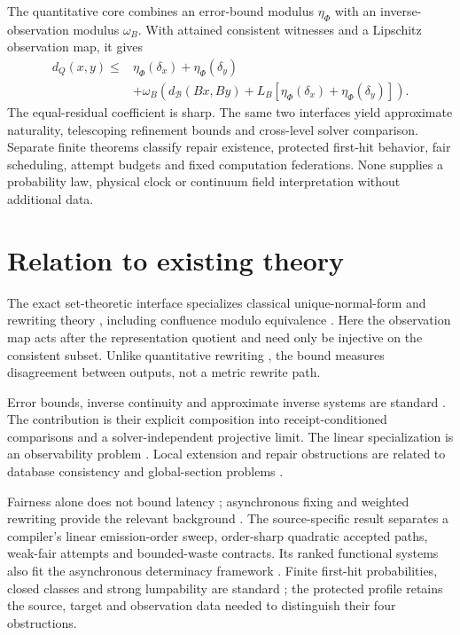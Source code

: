 \documentclass[11pt]{article}
\theoremstyle{definition}
\theoremstyle{remark}
\numberwithin{equation}{section}
\newcommand{\cB}{\mathcal B}
\begin{document}
The quantitative core combines an error-bound modulus $\eta_\Phi$ with
an inverse-observation modulus $\omega_B$. With attained consistent
witnesses and a Lipschitz observation map, it gives
\begin{equation}\label{eq:intro-master}
\begin{split}
 d_Q(x,y)\le{}&\eta_\Phi(\delta_x)+\eta_\Phi(\delta_y)\\
 &+\omega_B\!\left(d_{\cB}(Bx,By)
 +L_B[\eta_\Phi(\delta_x)+\eta_\Phi(\delta_y)]\right).
\end{split}
\end{equation}
The equal-residual coefficient is sharp. The same two interfaces yield
approximate naturality, telescoping refinement bounds and cross-level
solver comparison. Separate finite theorems classify repair existence,
protected first-hit behavior, fair scheduling, attempt budgets and fixed
computation federations. None supplies a probability law, physical clock
or continuum field interpretation without additional data.

\section{Relation to existing theory}\label{sec:related}

The exact set-theoretic interface specializes classical unique-normal-form
and rewriting theory \citep{Newman1942,Huet1980,BaaderNipkow1998,Terese2003},
including confluence modulo equivalence
\citep{ChristiansenKirkeby2016,GallFruehwirth2018,CampbellPlump2021}.
Here the observation map acts after the representation quotient and need
only be injective on the consistent subset. Unlike quantitative rewriting
\citep{GavazzoDiFlorio2022}, the bound measures disagreement between outputs,
not a metric rewrite path.

Error bounds, inverse continuity and approximate inverse systems are
standard \citep{Kruger2015,CibulkaDontchevKruger2018,DontchevRockafellar2014,
MardesicSegal1989,MardesicRubin1989,Mardesic1993}. The contribution is their
explicit composition into receipt-conditioned comparisons and a
solver-independent projective limit. The linear specialization is an
observability problem \citep{Kailath1980,MontanariEtAl2023,Kravaris2024}.
Local extension and repair obstructions are related to database consistency
and global-section problems
\citep{BeeriEtAl1983,ArenasBertossiChomicki1999,AbramskyBrandenburger2011}.

Fairness alone does not bound latency
\citep{Lamport2000Fairness,DuboisTixeuil2011}; asynchronous fixing and
weighted rewriting provide the relevant background
\citep{AracenaEtAl2019,GadouleauRichard2018,Dijkstra1974,
KopMiddeldorpSternagel2017,AvanziniYamada2025}.
The source-specific result separates a compiler's linear emission-order
sweep, order-sharp quadratic accepted paths, weak-fair attempts and
bounded-waste contracts. Its ranked functional systems also fit the
asynchronous determinacy framework \citep{Kahn1974,Abramsky2011}.
Finite first-hit probabilities, closed classes and strong lumpability are
standard \citep{Norris1997,KemenySnell1976,BaierKatoen2008,RogersPitman1981};
the protected profile retains the source, target and observation data
needed to distinguish their four obstructions.
\end{document}
